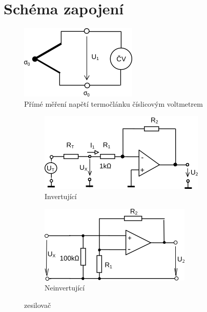 \documentclass{article}
\begin{document}
\section{Schéma zapojení}
\begin{figure}[H]
	\centering
	\includegraphics{scheme1}
	\caption{Přímé měření napětí termočlánku číslicovým voltmetrem}
	\label{fig:scheme1}
\end{figure}
\begin{figure}[H]
	\centering
	\begin{subfigure}{0.5\textwidth}
		\includegraphics[scale=0.7]{scheme2}
		\caption{Invertující}
		\label{fig:scheme2}
	\end{subfigure}
	\begin{subfigure}{0.45\textwidth}
		\includegraphics[scale=0.7]{scheme3}
		\caption{Neinvertující}
		\label{fig:scheme3}
	\end{subfigure}
	\caption{zesilovač}
\end{figure}
\end{document}
